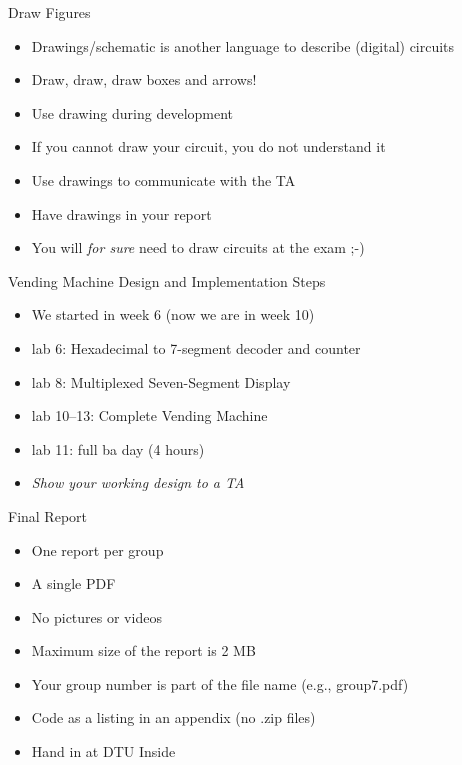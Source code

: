 \begin{frame}[fragile]{Draw Figures}
\begin{itemize}
\item Drawings/schematic is another language to describe (digital) circuits
\item Draw, draw, draw boxes and arrows!
\item Use drawing during development
\item If you cannot draw your circuit, you do not understand it
\item Use drawings to communicate with the TA
\item Have drawings in your report
\item You will \emph{for sure} need to draw circuits at the exam ;-)
\end{itemize}
\end{frame}


\begin{frame}[fragile]{Vending Machine Design and Implementation Steps}
\begin{itemize}
\item We started in week 6 (now we are in week 10)
\item lab 6: Hexadecimal to 7-segment decoder and counter
\item lab 8: Multiplexed Seven-Segment Display
\item lab 10--13: Complete Vending Machine
\item lab 11: full ba day (4 hours)
\item \emph{Show your working design to a TA}
\end{itemize}
\end{frame}

\begin{frame}[fragile]{Final Report}
\begin{itemize}
\item One report per group
\item A single PDF
\item No pictures or videos
\item Maximum size of the report is 2 MB
\item Your group number is part of the file name (e.g., group7.pdf)
\item Code as a listing in an appendix (no .zip files)
\item Hand in at DTU Inside
\end{itemize}
\end{frame}

